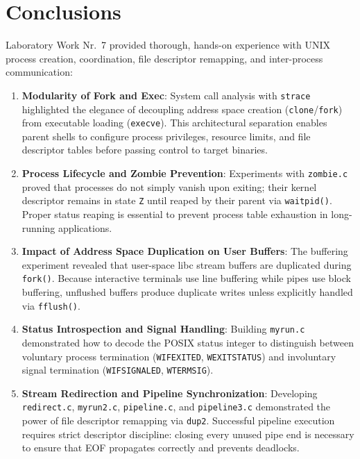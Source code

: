 \documentclass[12pt,a4paper]{article}
\begin{document}
\newpage

\section{Conclusions}

Laboratory Work Nr.~7 provided thorough, hands-on experience with UNIX process creation, coordination, file descriptor remapping, and inter-process communication:

\begin{enumerate}
    \item \textbf{Modularity of Fork and Exec}: System call analysis with \texttt{strace} highlighted the elegance of decoupling address space creation (\texttt{clone}/\texttt{fork}) from executable loading (\texttt{execve}). This architectural separation enables parent shells to configure process privileges, resource limits, and file descriptor tables before passing control to target binaries.
    \item \textbf{Process Lifecycle and Zombie Prevention}: Experiments with \texttt{zombie.c} proved that processes do not simply vanish upon exiting; their kernel descriptor remains in state \texttt{Z} until reaped by their parent via \texttt{waitpid()}. Proper status reaping is essential to prevent process table exhaustion in long-running applications.
    \item \textbf{Impact of Address Space Duplication on User Buffers}: The buffering experiment revealed that user-space libc stream buffers are duplicated during \texttt{fork()}. Because interactive terminals use line buffering while pipes use block buffering, unflushed buffers produce duplicate writes unless explicitly handled via \texttt{fflush()}.
    \item \textbf{Status Introspection and Signal Handling}: Building \texttt{myrun.c} demonstrated how to decode the POSIX status integer to distinguish between voluntary process termination (\texttt{WIFEXITED}, \texttt{WEXITSTATUS}) and involuntary signal termination (\texttt{WIFSIGNALED}, \texttt{WTERMSIG}).
    \item \textbf{Stream Redirection and Pipeline Synchronization}: Developing \texttt{redirect.c}, \texttt{myrun2.c}, \texttt{pipeline.c}, and \texttt{pipeline3.c} demonstrated the power of file descriptor remapping via \texttt{dup2}. Successful pipeline execution requires strict descriptor discipline: closing every unused pipe end is necessary to ensure that EOF propagates correctly and prevents deadlocks.
\end{enumerate}
\end{document}
